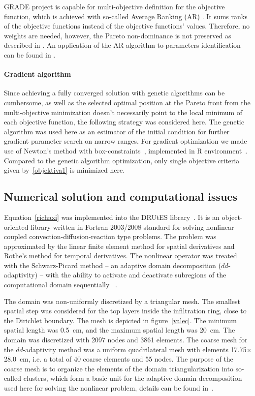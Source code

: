 \documentclass[review,times,3p,10pt]{elsarticle}
\begin{document}
GRADE project is capable for multi-objective definition for the objective function, which is achieved with so-called
 Average Ranking (AR) \citep{Leps2007}. It sums ranks of the objective functions instead of the objective functions' values. Therefore, no weights are needed, however, the Pareto non-dominance is not preserved as described in \cite{vitingerova:2010}. An application of the AR algorithm to parameters identification can be found in \cite{Kuraz:2010:JCAM}. 

 
 
 {
 \paragraph{Gradient algorithm} 
 
 Since achieving a fully converged solution with genetic algorithms can be cumbersome, as well as the selected optimal position at the Pareto front from the multi-objective minimization doesn't necessarily point to the  local minimum of each objective function, the following strategy was considered here. The genetic algorithm was used here as an estimator of the initial condition for further gradient parameter search on narrow ranges. For gradient optimization we made use of Newton's method with box-constraints~\citep{byrd1995}, implemented in R environment~\citep{R-env}. Compared to the genetic algorithm optimization, only single objective criteria given by~\eqref{objektiva1} is minimized here.
}


\subsection{Numerical solution and computational issues}
\label{trapoty}

Equation~\eqref{richaxi} was implemented into the DRUtES library~\citep{drutes}. It is an object-oriented library written in Fortran 2003/2008 standard for solving nonlinear coupled convection-diffusion-reaction type problems. The problem was approximated by the linear finite element method for spatial derivatives and Rothe's method for temporal derivatives. The nonlinear operator was treated with the Schwarz-Picard method -- an adaptive domain decomposition  ($dd$-adaptivity) -- with the ability to activate and deactivate subregions of the computational domain sequentially ~\citep{mojecomp, mojejcam2, mojeamc2}.



 The domain was non-uniformly discretized by a triangular mesh. The smallest spatial step was considered for the top layers inside the infiltration ring, close to the Dirichlet boundary. The mesh is depicted in figure~\ref{valec}. The minimum spatial length was 0.5~cm, and the maximum spatial length was 20~cm. The domain was discretized with 2097 nodes and 3861 elements. The coarse mesh for the $dd$-adaptivity method was a uniform quadrilateral mesh with elements 17.75$\times$28.0~cm, i.e. a total of 40 coarse elements and 55 nodes. The purpose of the coarse mesh is to organize the elements of the domain triangularization into so-called clusters, which form a basic unit for the adaptive domain decomposition used here for solving the nonlinear problem, details can be found in~\citep{mojeamc2}.
\end{document}
